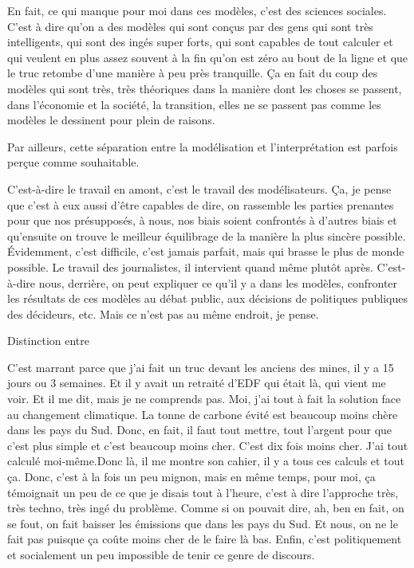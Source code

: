 \begin{displayquote}
    En fait, ce qui manque pour moi dans ces modèles, c'est des sciences sociales. C'est à dire qu'on a des modèles qui sont conçus par des gens qui sont très intelligents, qui sont des ingés super forts, qui sont capables de tout calculer et qui veulent en plus assez souvent à la fin qu'on est zéro au bout de la ligne et que le truc retombe d'une manière à peu près tranquille. Ça en fait du coup des modèles qui sont très, très théoriques dans la manière dont les choses se passent, dans l'économie et la société, la transition, elles ne se passent pas comme les modèles le dessinent pour plein de raisons.
\end{displayquote}
Par ailleurs, cette séparation entre la modélisation et l'interprétation est parfois perçue comme souhaitable. 
\begin{displayquote}
    C'est-à-dire le travail en amont, c'est le travail des modélisateurs. Ça, je pense que c'est à eux aussi d'être capables de dire, on rassemble les parties prenantes pour que nos présupposés, à nous, nos biais soient confrontés à d'autres biais et qu'ensuite on trouve le meilleur équilibrage de la manière la plus sincère possible. Évidemment, c'est difficile, c'est jamais parfait, mais qui brasse le plus de monde possible. Le travail des journalistes, il intervient quand même plutôt après. C'est-à-dire nous, derrière, on peut expliquer ce qu'il y a dans les modèles, confronter les résultats de ces modèles au débat public, aux décisions de politiques publiques des décideurs, etc. Mais ce n'est pas au même endroit, je pense.
\end{displayquote}
Distinction entre 
\begin{displayquote}
    C'est marrant parce que j'ai fait un truc devant les anciens des mines, il y a 15 jours ou 3 semaines. Et il y avait un retraité d'EDF qui était là,  qui vient me voir. Et il me dit, mais je ne comprends pas. Moi, j'ai tout à fait la solution face au changement climatique. La tonne de carbone évité est beaucoup moins chère dans les pays du Sud. Donc, en fait, il faut tout mettre, tout l'argent pour que c'est plus simple et c'est beaucoup moins cher. C'est dix fois moins cher. J'ai tout calculé moi-même.Donc là, il me montre son cahier, il y a tous ces calculs et tout ça. Donc, c'est à la fois un peu mignon, mais en même temps, pour moi, ça témoignait un peu de ce que je disais tout à l'heure, c'est à dire l'approche très, très techno, très ingé du problème. Comme si on pouvait dire, ah, ben en fait, on se fout, on fait baisser les émissions que dans les pays du Sud. Et nous, on ne le fait pas puisque ça coûte moins cher de le faire là bas. Enfin, c'est politiquement et socialement un peu impossible de tenir ce genre de discours.
\end{displayquote}


